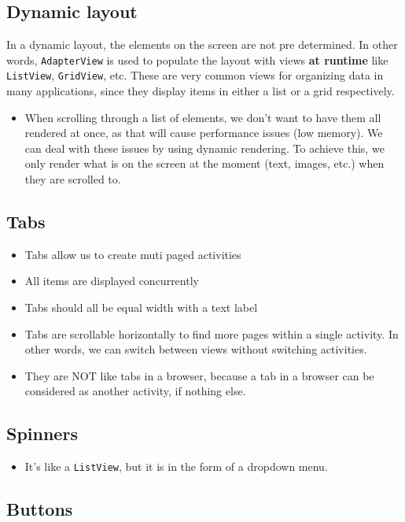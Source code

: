 \documentclass[12pt]{book}
\begin{document}
\subsection*{Dynamic layout}
In a dynamic layout, the elements on the screen are not pre determined. In other words, \texttt{AdapterView} is used to populate the layout with views \textbf{at runtime} like \texttt{ListView}, \texttt{GridView}, etc. These are very common views for organizing data in many applications, since they display items in either a list or a grid respectively.
\begin{itemize}
  \item When scrolling through a list of elements, we don't want to have them all rendered at once, as that will cause performance issues (low memory). We can deal with these issues by using dynamic rendering. To achieve this, we only render what is on the screen at the moment (text, images, etc.) when they are scrolled to.
\end{itemize}

\subsection*{Tabs}

\begin{itemize}
  \item Tabs allow us to create muti paged activities
  \item All items are displayed concurrently
  \item Tabs should all be equal width with a text label
  \item Tabs are scrollable horizontally to find more pages within a single activity. In other words, we can switch between views without switching activities.
  \item They are NOT like tabs in a browser, because a tab in a browser can be considered as another activity, if nothing else.
\end{itemize}

\subsection*{Spinners}
\begin{itemize}
  \item It's like a \texttt{ListView}, but it is in the form of a dropdown menu.
\end{itemize}

\subsection*{Buttons}
\end{document}
